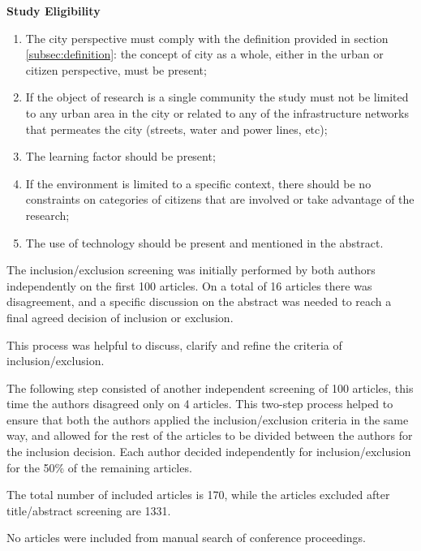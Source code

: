 \textbf{Study Eligibility}
\begin{enumerate}
\item The city perspective must comply with the definition provided in section \ref{subsec:definition}: the concept of city as a whole, either in the urban or citizen perspective, must be present;
\item If the object of research is a single community the study must not be limited to any urban area in the city or related to any of the infrastructure networks that permeates the city (streets, water and power lines, etc);
\item The learning factor should be present;
\item If the environment is limited to a specific context, there should be no constraints on categories of citizens that are involved or take advantage of the research;
\item The use of technology should be present and mentioned in the abstract.
\end{enumerate}

The inclusion/exclusion screening was initially performed by both authors independently on the first 100 articles. On a total of 16 articles there was disagreement, and a specific discussion on the abstract was needed to reach a final agreed decision of inclusion or exclusion.

This process was helpful to discuss, clarify and refine the criteria of inclusion/exclusion.

The following step consisted of another independent screening of 100 articles, this time the authors disagreed only on 4 articles. This two-step process helped to ensure that both the authors applied the inclusion/exclusion criteria in the same way, and allowed for the rest of the articles to be divided between the authors for the inclusion decision. Each author decided independently for inclusion/exclusion for the 50\% of the remaining articles.

The total number of included articles is 170, while the articles excluded after title/abstract screening are 1331.

No articles were included from manual search of conference proceedings.